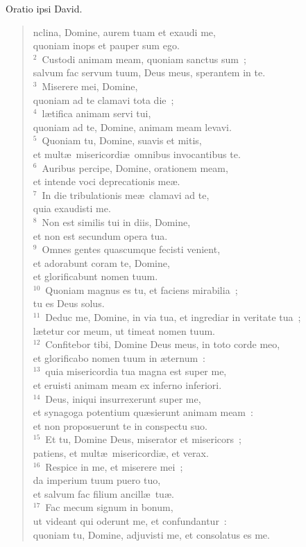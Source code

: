 \bchapter[Psalm]
Oratio ipsi David. \begin{verse}nclina, Domine, aurem tuam et exaudi me,\\ quoniam inops et pauper sum ego.\\
${}^{2}$~Custodi animam meam, quoniam sanctus sum~;\\ salvum fac servum tuum, Deus meus, sperantem in te.\\
${}^{3}$~Miserere mei, Domine,\\ quoniam ad te clamavi tota die~;\\
${}^{4}$~l\ae tifica animam servi tui,\\ quoniam ad te, Domine, animam meam levavi.\\
${}^{5}$~Quoniam tu, Domine, suavis et mitis,\\ et mult\ae\ misericordi\ae\ omnibus invocantibus te.\\
${}^{6}$~Auribus percipe, Domine, orationem meam,\\ et intende voci deprecationis me\ae .\\
${}^{7}$~In die tribulationis me\ae\ clamavi ad te,\\ quia exaudisti me.\\
${}^{8}$~Non est similis tui in diis, Domine,\\ et non est secundum opera tua.\\
${}^{9}$~Omnes gentes quascumque fecisti venient,\\ et adorabunt coram te, Domine,\\ et glorificabunt nomen tuum.\\
${}^{10}$~Quoniam magnus es tu, et faciens mirabilia~;\\ tu es Deus solus.\\
${}^{11}$~Deduc me, Domine, in via tua, et ingrediar in veritate tua~;\\ l\ae tetur cor meum, ut timeat nomen tuum.\\
${}^{12}$~Confitebor tibi, Domine Deus meus, in toto corde meo,\\ et glorificabo nomen tuum in \ae ternum~:\\
${}^{13}$~quia misericordia tua magna est super me,\\ et eruisti animam meam ex inferno inferiori.\\
${}^{14}$~Deus, iniqui insurrexerunt super me,\\ et synagoga potentium qu\ae sierunt animam meam~:\\ et non proposuerunt te in conspectu suo.\\
${}^{15}$~Et tu, Domine Deus, miserator et misericors~;\\ patiens, et mult\ae\ misericordi\ae , et verax.\\
${}^{16}$~Respice in me, et miserere mei~;\\ da imperium tuum puero tuo,\\ et salvum fac filium ancill\ae\ tu\ae .\\
${}^{17}$~Fac mecum signum in bonum,\\ ut videant qui oderunt me, et confundantur~:\\ quoniam tu, Domine, adjuvisti me, et consolatus es me.\end{verse}
